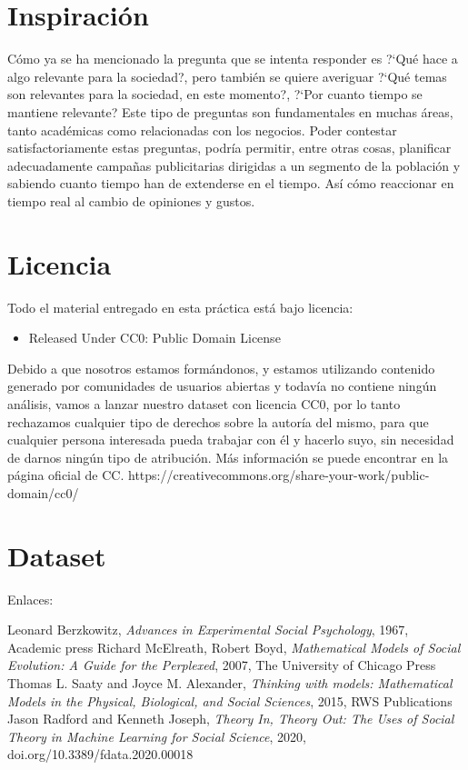 \documentclass[a4paper,12pt]{article}
\begin{document}
\section{Inspiraci\'on}

C\'omo ya se ha mencionado la pregunta que se intenta responder es ?`Qu\'e hace a algo relevante para la sociedad?, pero tambi\'en se quiere averiguar ?`Qu\'e temas son relevantes para la sociedad, en este momento?, ?`Por cuanto tiempo se mantiene  relevante? Este tipo de preguntas son fundamentales en muchas \'areas, tanto acad\'emicas como relacionadas con los negocios. Poder contestar satisfactoriamente estas preguntas, podr\'ia permitir, entre otras cosas, planificar adecuadamente campa\~nas publicitarias dirigidas a un segmento de la poblaci\'on y sabiendo cuanto tiempo han de extenderse en el tiempo. As\'i c\'omo reaccionar en tiempo real al cambio de opiniones y gustos.

\section{Licencia}

Todo el material entregado en esta pr\'actica est\'a bajo licencia:

\begin{itemize}

\item Released Under CC0: Public Domain License


\end{itemize}

Debido a que nosotros estamos form\'andonos, y estamos utilizando contenido generado por comunidades de usuarios abiertas y todav\'ia no contiene ning\'un an\'alisis, vamos a lanzar nuestro dataset con licencia CC0, por lo tanto rechazamos cualquier tipo de derechos sobre la autor\'ia del mismo, para que cualquier persona interesada pueda trabajar con \'el y hacerlo suyo, sin necesidad de darnos ning\'un tipo de atribuci\'on.  M\'as informaci\'on se puede encontrar en la p\'agina oficial de CC.
https://creativecommons.org/share-your-work/public-domain/cc0/



\section{Dataset}

Enlaces:


\begin{thebibliography}{9}

 Leonard Berzkowitz,%
	\emph{ Advances in Experimental Social Psychology}, 1967,  Academic press
 Richard McElreath, Robert Boyd,%
	\emph{ Mathematical Models of Social Evolution: A Guide for the Perplexed}, 2007, The University of Chicago Press
Thomas L. Saaty and Joyce M. Alexander,%
	\emph{Thinking with models: Mathematical Models in the Physical, Biological, and Social Sciences}, 2015, RWS Publications
Jason Radford and Kenneth Joseph,%
	\emph{Theory In, Theory Out: The Uses of Social Theory in Machine Learning for Social Science}, 2020, doi.org/10.3389/fdata.2020.00018

\end{thebibliography}
\end{document}
